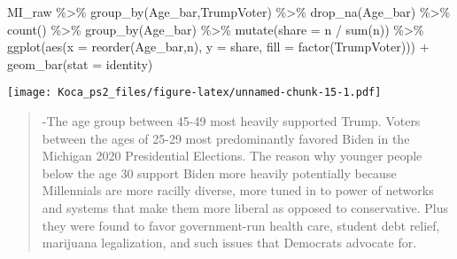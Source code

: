 \documentclass[
]{article}
\newenvironment{Shaded}{\begin{snugshade}}{\end{snugshade}}
\newcommand{\AttributeTok}[1]{\textcolor[rgb]{0.77,0.63,0.00}{#1}}
\newcommand{\FunctionTok}[1]{\textcolor[rgb]{0.00,0.00,0.00}{#1}}
\newcommand{\NormalTok}[1]{#1}
\newcommand{\SpecialCharTok}[1]{\textcolor[rgb]{0.00,0.00,0.00}{#1}}
\newcommand{\StringTok}[1]{\textcolor[rgb]{0.31,0.60,0.02}{#1}}
\begin{document}
\begin{Shaded}
\begin{Highlighting}[]
\NormalTok{MI\_raw }\SpecialCharTok{\%\textgreater{}\%} 
  \FunctionTok{group\_by}\NormalTok{(Age\_bar,TrumpVoter) }\SpecialCharTok{\%\textgreater{}\%}
  \FunctionTok{drop\_na}\NormalTok{(Age\_bar) }\SpecialCharTok{\%\textgreater{}\%}
  \FunctionTok{count}\NormalTok{() }\SpecialCharTok{\%\textgreater{}\%}
  \FunctionTok{group\_by}\NormalTok{(Age\_bar) }\SpecialCharTok{\%\textgreater{}\%}
  \FunctionTok{mutate}\NormalTok{(}\AttributeTok{share =}\NormalTok{ n }\SpecialCharTok{/} \FunctionTok{sum}\NormalTok{(n)) }\SpecialCharTok{\%\textgreater{}\%}
  \FunctionTok{ggplot}\NormalTok{(}\FunctionTok{aes}\NormalTok{(}\AttributeTok{x =} \FunctionTok{reorder}\NormalTok{(Age\_bar,n), }\AttributeTok{y =}\NormalTok{ share, }\AttributeTok{fill =} \FunctionTok{factor}\NormalTok{(TrumpVoter))) }\SpecialCharTok{+}
  \FunctionTok{geom\_bar}\NormalTok{(}\AttributeTok{stat =} \StringTok{\textquotesingle{}identity\textquotesingle{}}\NormalTok{)}
\end{Highlighting}
\end{Shaded}

\texttt{[image: Koca\_ps2\_files/figure-latex/unnamed-chunk-15-1.pdf]}

\begin{quote}
-The age group between 45-49 most heavily supported Trump. Voters
between the ages of 25-29 most predominantly favored Biden in the
Michigan 2020 Presidential Elections. The reason why younger people
below the age 30 support Biden more heavily potentially because
Millennials are more racilly diverse, more tuned in to power of networks
and systems that make them more liberal as opposed to conservative. Plus
they were found to favor government-run health care, student debt
relief, marijuana legalization, and such issues that Democrats advocate
for.
\end{quote}
\end{document}
